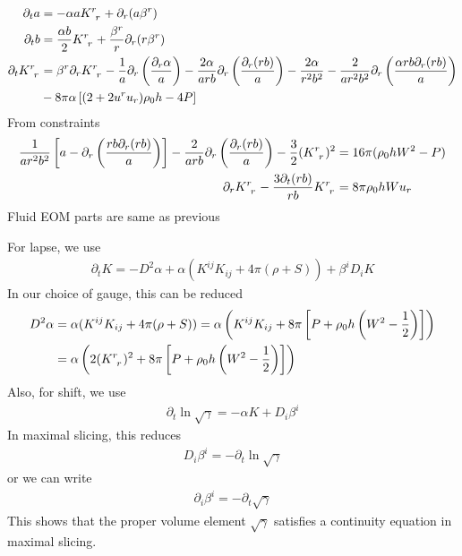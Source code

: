 \documentclass[prd]{revtex4}
\begin{document}
\begin{align}
\partial_t a &= - \alpha a K\indices{^r_r} + \partial_r (a \beta^r) \\
\partial_t b &=  \frac{\alpha b}{2} K\indices{^r_r} + \frac{\beta^r}{r} \partial_r (r \beta^r) \\
\partial_t K\indices{^r_r} &= \beta^r \partial_r K\indices{^r_r}  - \frac{1}{a} \partial_r \left( \frac{\partial_r \alpha}{a} \right) - \frac{2 \alpha}{arb} \partial_r \left( \frac{\partial_r (rb)}{a} \right) 
-  \frac{2 \alpha}{r^2 b^2} - \frac{2}{ar^2b^2} \partial_r \left( \frac{\alpha r b \partial_r (rb)}{a} \right)  \nonumber \\
& - 8 \pi \alpha \left[ (2+2 u^r u_r) \rho_0 h - 4P \right] 
\end{align}
From constraints
\begin{align}
 \frac{1}{ar^2b^2} \left[a-\partial_r \left(\frac{rb \partial_r (rb)}{a} \right) \right] -\frac{2}{arb} \partial_r \left(\frac{\partial_r (rb)}{a} \right) - \frac{3}{2}(K\indices{^r_r})^2 &= 16 \pi (\rho_0 h W^2 -P) \nonumber \\
  \partial_r K\indices{^r_r} -\frac{3 \partial_t (r b)}{rb}  K\indices{^r_r} &= 8 \pi \rho_0 h W u_r
\end{align}
Fluid EOM parts are same as previous

For lapse, we use 
\begin{align}
\partial_t K = - D^2 \alpha + \alpha (K^{ij}K_{ij} + 4 \pi (\rho + S))+ \beta^i D_i K
\end{align}
In our choice of gauge, this can be reduced
\begin{align}
D^2 \alpha &= \alpha ( K^{ij} K_{ij} + 4 \pi (\rho + S)) = \alpha \left( K^{ij} K_{ij} + 8 \pi \left[P + \rho_0 h \left(W^2 - \frac{1}{2}  \right)\right]\right) \nonumber \\
&= \alpha \left( 2(K\indices{^r_r})^2 + 8 \pi \left[P + \rho_0 h \left(W^2 - \frac{1}{2}  \right)\right]\right)
\end{align}
Also, for shift, we use
\begin{align}
\partial_t \ln \sqrt{\gamma} = - \alpha K + D_i \beta^i 
\end{align}
In maximal slicing, this reduces
\begin{align}
D_i \beta^i = - \partial_t \ln \sqrt{\gamma}  
\end{align}
or we can write 
\begin{align}
\partial_i \beta^i = - \partial_t \sqrt{\gamma}  
\end{align}
This shows that the proper volume element $\sqrt{\gamma}$ satisfies a continuity equation in maximal slicing.
\end{document}
